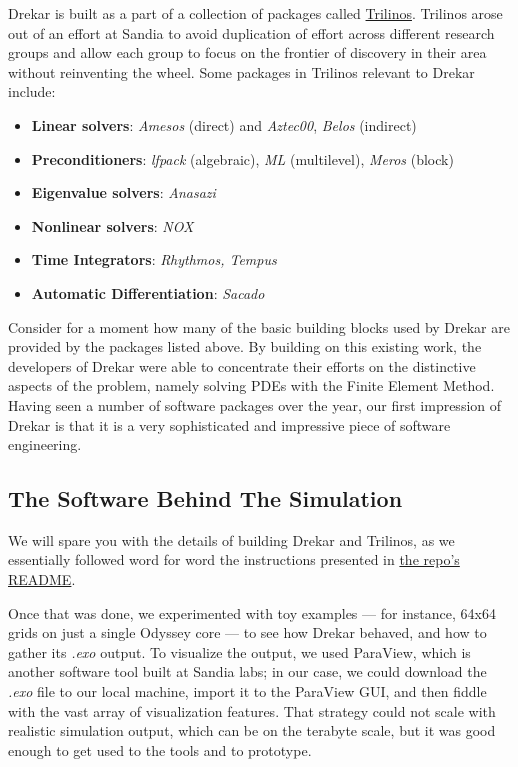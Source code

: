 \documentclass[11pt]{article} %
\begin{document}
Drekar is built as a part of a collection of packages called
\href{https://trilinos.github.io/}{Trilinos}.
Trilinos arose out of an effort at Sandia to avoid duplication of effort across
different research groups and allow each group to focus on the frontier
of discovery in their area without reinventing the wheel.
Some packages in Trilinos relevant to Drekar include:
\begin{itemize}
\item{\textbf{Linear solvers}}: \textit{Amesos} (direct) and \textit{Aztec00}, \textit{Belos} (indirect)
\item{\textbf{Preconditioners}}: \textit{lfpack} (algebraic), \textit{ML} (multilevel), \textit{Meros} (block)
\item{\textbf{Eigenvalue solvers}}: \textit{Anasazi}
\item{\textbf{Nonlinear solvers}}: \textit{NOX}
\item{\textbf{Time Integrators}}: \textit{Rhythmos, Tempus}
\item{\textbf{Automatic Differentiation}}: \textit{Sacado}
\end{itemize}
Consider for a moment how many of the basic building blocks used by Drekar
are provided by the packages listed above.
By building on this existing work, the developers of Drekar were able 
to concentrate their efforts on the distinctive aspects of the problem,
namely solving PDEs with the Finite Element Method.
Having seen a number of software packages over the year, 
our first impression of Drekar is that it is a very sophisticated 
and impressive piece of software engineering.

\subsection{The Software Behind The Simulation}

We will spare you with the details of building Drekar and Trilinos, as we essentially followed word for word the instructions presented in 
\href{https://github.com/dsondak/DrekarBase/blob/master/README.md}{the repo's README}.

Once that was done, we experimented with toy examples --- for instance, 64x64 grids on just a single Odyssey core --- 
to see how Drekar behaved, and how to gather its \textit{.exo} output. To visualize the output, we used ParaView, 
which is another software tool built at Sandia labs; in our case, we could download the \textit{.exo} file to our local machine, 
import it to the ParaView GUI, and then fiddle with the vast array of visualization features. 
That strategy could not scale with realistic simulation output, which can be on the terabyte scale, 
but it was good enough to get used to the tools and to prototype.
\end{document}
